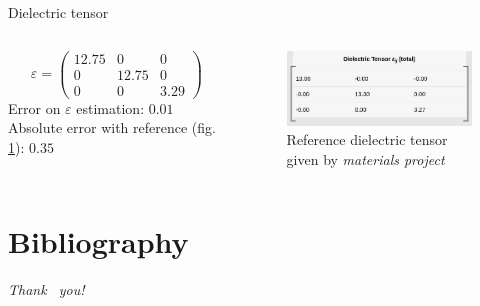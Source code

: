 \documentclass[dvipsnames]{beamer}
\begin{document}
	\begin{frame}{Dielectric tensor}
	\begin{columns}[T]
	\begin{column}{0.5\textwidth}
	\begin{equation}
	\varepsilon = 
        \begin{pmatrix}
        12.75 & 0 & 0 \\
        0 & 12.75 & 0 \\
        0 & 0 & 3.29
        \end{pmatrix} %
	\end{equation}
	Error on $\varepsilon$ estimation: $0.01$
	Absolute error with reference (fig. \ref{fig:ref_eps}): $0.35$
	\end{column}
	\hfill
	\begin{column}{0.5\textwidth}
	\begin{figure}
	\includegraphics[width=\textwidth]{graphs/dielectric_reference.png}
	\caption{Reference dielectric tensor given by \textit{materials project} \cite{osti_1202268}}
	\label{fig:ref_eps}
	\end{figure}
	\end{column}
	\end{columns}
	\end{frame}
	
	\section{Bibliography}
		
		\begin{frame}[allowframebreaks]
			
			\tiny
				
			
            
		\end{frame}

	\begin{frame}
		\begin{center}
			{\Huge \emph {\textrm{Thank  ~you!}}}
		\end{center}
	\end{frame}
\end{document}
